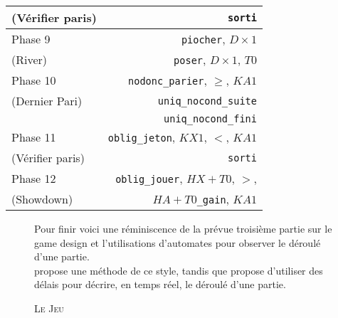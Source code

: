 \documentclass{cours}
\begin{document}
\begin{table}
\begin{tabular}{lr}
        (Vérifier paris) & \texttt{sorti}\\
        \midrule
        Phase 9 & \texttt{piocher}, $D \times 1$\\
        (River) & \texttt{poser}, $D\times 1$, $T0$\\
        \midrule
        Phase 10 & \texttt{nodonc\_parier}, $\geq$, $KA1$\\
        (Dernier Pari) & \texttt{uniq\_nocond\_suite}\\
        & \texttt{uniq\_nocond\_fini}\\
        \midrule
        Phase 11 & \texttt{oblig\_jeton}, $KX1$, $<$, $KA1$\\
        (Vérifier paris) & \texttt{sorti}\\
        \midrule
        Phase 12 & \texttt{oblig\_jouer}, $HX + T0$, $>$,\\
        (Showdown) & $HA + T0$\texttt{\_gain}, $KA1$\\
        \bottomrule
    \end{tabular}
\end{table}

\begin{figure}[h]
    \centering
    \begin{center}
        \vspace{1cm}
        Pour finir voici une réminiscence de la prévue troisième partie sur le game design et l'utilisations d'automates pour observer le déroulé d'une partie.\\ \cite{game-design-automata} propose une méthode de ce style, tandis que \cite{timed-automatas-games} propose d'utiliser des délais pour décrire, en temps réel, le déroulé d'une partie. 
    \end{center}
    \caption{\textsc{Le Jeu}}
    \label{fig:dfa:lejeu}
\end{figure}
\end{document}
